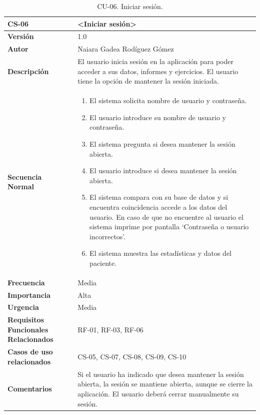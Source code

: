 \begin{table}[h!]
\centering
\begin{tabular}{ |m{3cm}|m{11cm}|  } 
\hline
\cellcolor[HTML]{B9E3F0}\textbf{CS-06} & \cellcolor[HTML]{B9E3F0}\textbf{<Iniciar sesión>}\\

\hline
\cellcolor[HTML]{EFEFEF}\textbf{Versión}             & 1.0  \\
\hline
\cellcolor[HTML]{EFEFEF}\textbf{Autor}                & Naiara Gadea Rodíguez Gómez\\
\hline
\cellcolor[HTML]{EFEFEF}\textbf{Descripción}                & {El usuario inicia sesión en la aplicación para poder acceder a sus datos, informes y ejercicios. El usuario tiene la opción de mantener la sesión iniciada. }\\
\hline
\cellcolor[HTML]{EFEFEF}\textbf{Secuencia \newline Normal}                &                 
        \begin{enumerate}
			\def\labelenumi{\arabic{enumi}.}
			\tightlist
			\item El sistema solicita nombre de usuario y contraseña.
			\item El usuario introduce su nombre de usuario y contraseña. 
                \item El sistema pregunta si desea mantener la sesión abierta.
                \item El usuario introduce si desea mantener la sesión abierta. 
                \item El sistema compara con su base de datos y si encuentra coincidencia accede a los datos del usuario. En caso de que no encuentre al usuario el sistema imprime por pantalla ‘Contraseña o usuario incorrectos’.
                \item El sistema muestra las estadísticas y datos del paciente.
		\end{enumerate}\\
\hline
\cellcolor[HTML]{EFEFEF}\textbf{Frecuencia}                & Media\\
\hline
\cellcolor[HTML]{EFEFEF}\textbf{Importancia}                & Alta\\
\hline
\cellcolor[HTML]{EFEFEF}\textbf{Urgencia}                & Media\\
\hline
\cellcolor[HTML]{EFEFEF}\textbf{Requisitos Funcionales Relacionados}                & {RF-01, RF-03, RF-06 }\\
\hline
\cellcolor[HTML]{EFEFEF}\textbf{Casos de uso relacionados}                & {CS-05, CS-07, CS-08, CS-09, CS-10}\\
\hline
\cellcolor[HTML]{EFEFEF}\textbf{Comentarios}                & {Si el usuario ha indicado que desea mantener la sesión abierta, la sesión se mantiene abierta, aunque se cierre la aplicación. El usuario deberá cerrar manualmente su sesión. }\\
\hline
\end{tabular}
\caption{CU-06. Iniciar sesión.}
\end{table}

